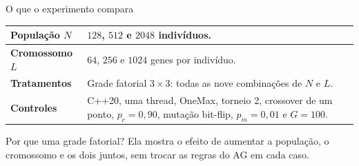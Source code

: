 \documentclass[aspectratio=169,11pt]{beamer}
\begin{document}
\begin{frame}{O que o experimento compara}
    \renewcommand{\arraystretch}{1.32}
    \begin{tabularx}{\textwidth}{>{\bfseries}p{} X}
        População $N$ & $128$, $512$ e $2048$ indivíduos. \\
        \hline
        Cromossomo $L$ & $64$, $256$ e $1024$ genes por indivíduo. \\
        \hline
        Tratamentos & Grade fatorial $3 \times 3$: todas as nove combinações de $N$ e $L$. \\
        \hline
        Controles & C++20, uma thread, OneMax, torneio 2, crossover de um ponto, $p_c=0{,}90$, mutação bit-flip, $p_m=0{,}01$ e $G=100$. \\
    \end{tabularx}
    \vspace{0.28cm}
    \begin{questionbox}{Por que uma grade fatorial?}
        Ela mostra o efeito de aumentar a população, o cromossomo e os dois juntos,
        sem trocar as regras do AG em cada caso.
    \end{questionbox}
\end{frame}
\end{document}
